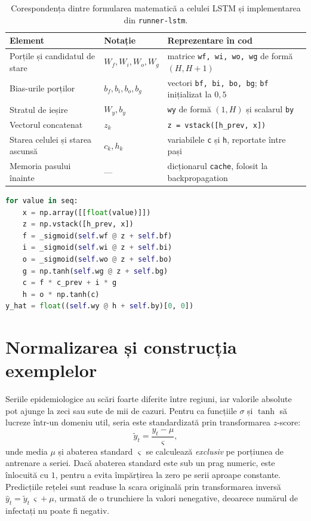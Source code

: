 \begin{table}[t]
\centering
\caption[Componentele celulei LSTM]{Corespondența dintre formularea matematică a celulei LSTM și implementarea din \texttt{runner-lstm}.}
\label{tab:lstm_componente}
\begin{tabularx}{0.96\textwidth}{l l X}
\toprule
\textbf{Element} & \textbf{Notație} & \textbf{Reprezentare în cod} \\
\midrule
Porțile și candidatul de stare & $W_f, W_i, W_o, W_g$ & matrice \texttt{wf, wi, wo, wg} de formă $(H, H{+}1)$ \\
Bias-urile porților & $b_f, b_i, b_o, b_g$ & vectori \texttt{bf, bi, bo, bg}; \texttt{bf} inițializat la $0{,}5$ \\
Stratul de ieșire & $W_y, b_y$ & \texttt{wy} de formă $(1, H)$ și scalarul \texttt{by} \\
Vectorul concatenat & $z_k$ & \texttt{z = vstack([h\_prev, x])} \\
Starea celulei și starea ascunsă & $c_k, h_k$ & variabilele \texttt{c} și \texttt{h}, reportate între pași \\
Memoria pasului înainte & --- & dicționarul \texttt{cache}, folosit la backpropagation \\
\bottomrule
\end{tabularx}
\end{table}

\begin{lstlisting}[language=Python, caption={Pasul înainte al celulei LSTM în \texttt{runner-lstm}.}, label={lst:lstm_forward}]
for value in seq:
    x = np.array([[float(value)]])
    z = np.vstack([h_prev, x])
    f = _sigmoid(self.wf @ z + self.bf)
    i = _sigmoid(self.wi @ z + self.bi)
    o = _sigmoid(self.wo @ z + self.bo)
    g = np.tanh(self.wg @ z + self.bg)
    c = f * c_prev + i * g
    h = o * np.tanh(c)
y_hat = float((self.wy @ h + self.by)[0, 0])
\end{lstlisting}

\section{Normalizarea și construcția exemplelor}
\label{sec:normalizare_lstm}

Seriile epidemiologice au scări foarte diferite între regiuni, iar valorile
absolute pot ajunge la zeci sau sute de mii de cazuri. Pentru ca funcțiile
$\sigma$ și $\tanh$ să lucreze într-un domeniu util, seria este standardizată
prin transformarea $z$-score:
\begin{equation}
\label{eq:normalizare}
\tilde{y}_t = \frac{y_t - \mu}{\varsigma},
\end{equation}
unde media $\mu$ și abaterea standard $\varsigma$ se calculează \emph{exclusiv}
pe porțiunea de antrenare a seriei. Dacă abaterea standard este sub un prag
numeric, este înlocuită cu $1$, pentru a evita împărțirea la zero pe serii
aproape constante. Predicțiile rețelei sunt readuse la scara originală prin
transformarea inversă $\hat{y}_t = \tilde{y}_t\,\varsigma + \mu$, urmată de o
trunchiere la valori nenegative, deoarece numărul de infectați nu poate fi
negativ.

